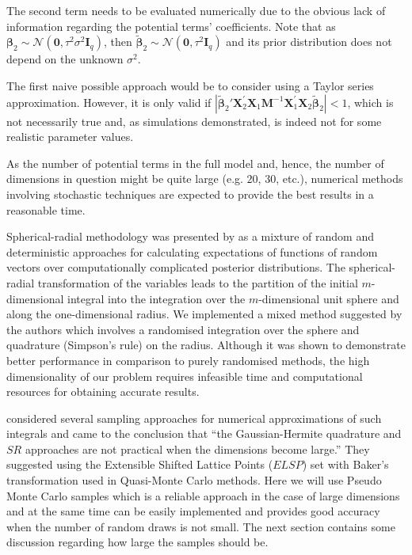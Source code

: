 The second term needs to be evaluated numerically due to the obvious lack of information regarding the potential terms' coefficients. Note that as $\bm{\beta}_2 \sim \mathcal{N}(\bm{0},\tau^{2}\sigma^{2}\bm{I}_{q})$, then $\bm{\tilde{\beta}}_2 \sim \mathcal{N}(\bm{0},\tau^{2}\bm{I}_{q})$ and its prior distribution does not depend on the unknown $\sigma^2$.

The first naive possible approach would be to consider using a Taylor series approximation. However, it is only valid if $|\bm{\tilde{\beta}}_2'\bm{X}_2^{'}\bm{X}_1\bm{M}^{-1}\bm{X}_1^{'}\bm{X}_2\bm{\tilde{\beta}}_2|<1$, which is not necessarily true and, as simulations demonstrated, is indeed not for some realistic parameter values.

As the number of potential terms in the full model and, hence, the number of dimensions in question might be quite large (e.g. $20$, $30$, etc.), numerical methods involving stochastic techniques are expected to provide the best results in a reasonable time. 

Spherical-radial methodology was presented by  \citet{Monahan1997spherical} as a mixture of random and deterministic  approaches for calculating expectations of functions of random vectors over computationally complicated posterior distributions. The spherical-radial transformation of the variables leads to the partition of the initial $m$-dimensional integral into the integration over the $m$-dimensional unit sphere and along the one-dimensional radius. We implemented a mixed method suggested by the authors which involves a randomised integration over the sphere and quadrature (Simpson's rule) on the radius. Although it was shown to demonstrate better performance in comparison to purely randomised methods, the high dimensionality of our problem requires infeasible time and computational resources for obtaining accurate results. 

\citet{Yu2008comparing} considered several sampling approaches for numerical approximations of such integrals and came to the conclusion that ``the Gaussian-Hermite quadrature and $SR$ approaches are not practical when the dimensions become large.'' They suggested using the Extensible Shifted Lattice Points ($ELSP$) set with Baker's transformation used in Quasi-Monte Carlo methods. Here we will use Pseudo Monte Carlo samples which is a reliable approach in the case of large dimensions and at the same time can be easily implemented and provides good accuracy when the number of random draws is not small. The next section contains some discussion regarding how large the samples should be.


